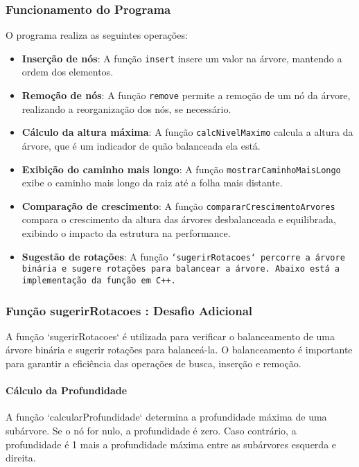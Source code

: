 \documentclass{article}
\begin{document}
\subsubsection{Funcionamento do Programa}
O programa realiza as seguintes operações:
\begin{itemize}
    \item \textbf{Inserção de nós}: A função \texttt{insert} insere um valor na árvore, mantendo a ordem dos elementos.
    \item \textbf{Remoção de nós}: A função \texttt{remove} permite a remoção de um nó da árvore, realizando a reorganização dos nós, se necessário.
    \item \textbf{Cálculo da altura máxima}: A função \texttt{calcNivelMaximo} calcula a altura da árvore, que é um indicador de quão balanceada ela está.
    \item \textbf{Exibição do caminho mais longo}: A função \texttt{mostrarCaminhoMaisLongo} exibe o caminho mais longo da raiz até a folha mais distante.
    \item \textbf{Comparação de crescimento}: A função \texttt{compararCrescimentoArvores} compara o crescimento da altura das árvores desbalanceada e equilibrada, exibindo o impacto da estrutura na performance.
    \item \textbf{Sugestão de rotações}: A função \texttt{`sugerirRotacoes` percorre a árvore binária e sugere rotações para balancear a árvore. Abaixo está a implementação da função em C++.}
\end{itemize}

\subsubsection{Função sugerirRotacoes : \textbf{Desafio Adicional}}

A função `sugerirRotacoes` é utilizada para verificar o balanceamento de uma árvore binária e sugerir rotações para balanceá-la. O balanceamento é importante para garantir a eficiência das operações de busca, inserção e remoção.

\paragraph{Cálculo da Profundidade}
A função `calcularProfundidade` determina a profundidade máxima de uma subárvore. Se o nó for nulo, a profundidade é zero. Caso contrário, a profundidade é 1 mais a profundidade máxima entre as subárvores esquerda e direita.
\end{document}
